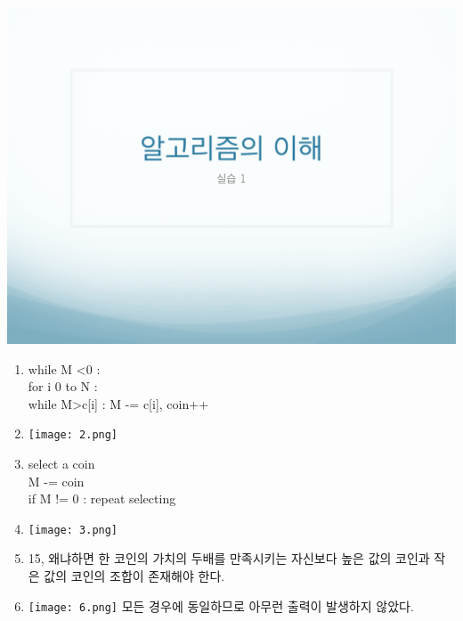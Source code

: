 \documentclass[12pt,a4paper]{article}
\begin{document}
\includegraphics[page=4, width=\textwidth]{1.pdf}
\begin{enumerate}
	\item 
	while M \textless 0 :\\
		for i 0 to N :\\
			while M\textgreater c[i] : M -= c[i], coin++\\
\item
	
\texttt{[image: 2.png]}	
\item
	select a coin\\
	M -= coin\\
	if M != 0 : repeat selecting

\item 
	
\texttt{[image: 3.png]}	

\item
	15, 왜냐하면 한 코인의 가치의 두배를 만족시키는 자신보다 높은 값의 코인과 작은 값의 코인의 조합이 존재해야 한다.
\item
	
\texttt{[image: 6.png]}	
모든 경우에 동일하므로 아무런 출력이 발생하지 않았다.

\end{enumerate}
\end{document}
